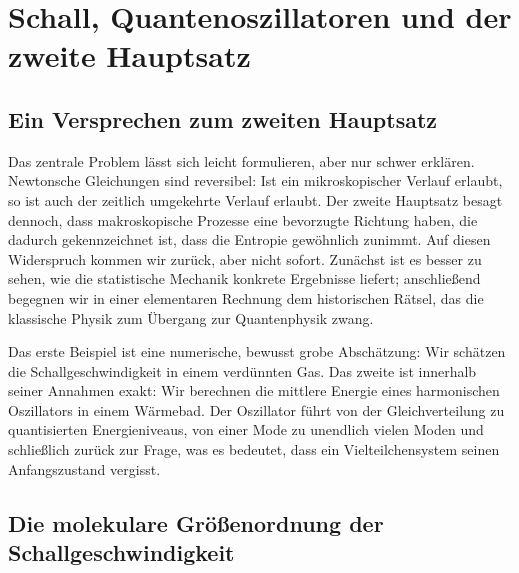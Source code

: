 \chapter{Schall, Quantenoszillatoren und der zweite Hauptsatz}


\section{Ein Versprechen zum zweiten Hauptsatz}

Das zentrale Problem lässt sich leicht formulieren, aber nur schwer erklären. Newtonsche Gleichungen sind reversibel: Ist ein mikroskopischer Verlauf erlaubt, so ist auch der zeitlich umgekehrte Verlauf erlaubt. Der zweite Hauptsatz besagt dennoch, dass makroskopische Prozesse eine bevorzugte Richtung haben, die dadurch gekennzeichnet ist, dass die Entropie gewöhnlich zunimmt. Auf diesen Widerspruch kommen wir zurück, aber nicht sofort. Zunächst ist es besser zu sehen, wie die statistische Mechanik konkrete Ergebnisse liefert; anschließend begegnen wir in einer elementaren Rechnung dem historischen Rätsel, das die klassische Physik zum Übergang zur Quantenphysik zwang.

Das erste Beispiel ist eine numerische, bewusst grobe Abschätzung: Wir schätzen die Schallgeschwindigkeit in einem verdünnten Gas. Das zweite ist innerhalb seiner Annahmen exakt: Wir berechnen die mittlere Energie eines harmonischen Oszillators in einem Wärmebad. Der Oszillator führt von der Gleichverteilung zu quantisierten Energieniveaus, von einer Mode zu unendlich vielen Moden und schließlich zurück zur Frage, was es bedeutet, dass ein Vielteilchensystem seinen Anfangszustand vergisst.

\section{Die molekulare Größenordnung der Schallgeschwindigkeit}

